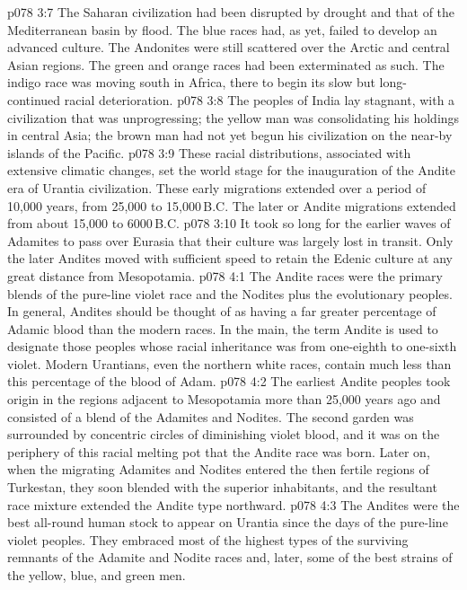 \vs p078 3:7 The Saharan civilization had been disrupted by drought and that of the Mediterranean basin by flood. The blue races had, as yet, failed to develop an advanced culture. The Andonites were still scattered over the Arctic and central Asian regions. The green and orange races had been exterminated as such. The indigo race was moving south in Africa, there to begin its slow but long\hyp{}continued racial deterioration.
\vs p078 3:8 The peoples of India lay stagnant, with a civilization that was unprogressing; the yellow man was consolidating his holdings in central Asia; the brown man had not yet begun his civilization on the near-by islands of the Pacific.
\vs p078 3:9 \pc These racial distributions, associated with extensive climatic changes, set the world stage for the inauguration of the Andite era of Urantia civilization. These early migrations extended over a period of 10,000 years, from 25,000 to 15,000\,B.C. The later or Andite migrations extended from about 15,000 to 6000\,B.C.
\vs p078 3:10 It took so long for the earlier waves of Adamites to pass over Eurasia that their culture was largely lost in transit. Only the later Andites moved with sufficient speed to retain the Edenic culture at any great distance from Mesopotamia.
\vs p078 4:1 The Andite races were the primary blends of the pure\hyp{}line violet race and the Nodites plus the evolutionary peoples. In general, Andites should be thought of as having a far greater percentage of Adamic blood than the modern races. In the main, the term Andite is used to designate those peoples whose racial inheritance was from one\hyp{}eighth to one\hyp{}sixth violet. Modern Urantians, even the northern white races, contain much less than this percentage of the blood of Adam.
\vs p078 4:2 The earliest Andite peoples took origin in the regions adjacent to Mesopotamia more than 25,000 years ago and consisted of a blend of the Adamites and Nodites. The second garden was surrounded by concentric circles of diminishing violet blood, and it was on the periphery of this racial melting pot that the Andite race was born. Later on, when the migrating Adamites and Nodites entered the then fertile regions of Turkestan, they soon blended with the superior inhabitants, and the resultant race mixture extended the Andite type northward.
\vs p078 4:3 The Andites were the best all\hyp{}round human stock to appear on Urantia since the days of the pure\hyp{}line violet peoples. They embraced most of the highest types of the surviving remnants of the Adamite and Nodite races and, later, some of the best strains of the yellow, blue, and green men.
